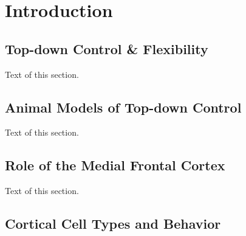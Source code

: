 \chapter{Introduction}

\section{Top-down Control \& Flexibility}
Text of this section.

\section{Animal Models of Top-down Control}
Text of this section.

\section{Role of the Medial Frontal Cortex}
Text of this section.

\section{Cortical Cell Types and Behavior}